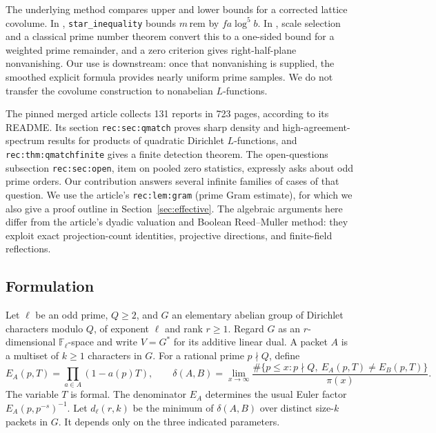 \documentclass[11pt]{article}
\theoremstyle{remark}\newtheorem{remark}[theorem]{Remark}
\newcommand{\F}{\mathbb F}
\begin{document}
The underlying method compares upper and lower bounds for a corrected lattice covolume. In , \texttt{star\_inequality} bounds $m\,\mathrm{rem}$ by $fa\log^5 b$. In , scale selection and a classical prime number theorem convert this to a one-sided bound for a weighted prime remainder, and a zero criterion gives right-half-plane nonvanishing. Our use is downstream: once that nonvanishing is supplied, the smoothed explicit formula provides nearly uniform prime samples. We do not transfer the covolume construction to nonabelian $L$-functions.

The pinned merged article \cite{article} collects 131 reports in 723 pages, according to its README. Its section \texttt{rec:sec:qmatch} proves sharp density and high-agreement-spectrum results for products of quadratic Dirichlet $L$-functions, and \texttt{rec:thm:qmatchfinite} gives a finite detection theorem. The open-questions subsection \texttt{rec:sec:open}, item on pooled zero statistics, expressly asks about odd prime orders. Our contribution answers several infinite families of cases of that question. We use the article's \texttt{rec:lem:gram} (prime Gram estimate), for which we also give a proof outline in Section~\ref{sec:effective}. The algebraic arguments here differ from the article's dyadic valuation and Boolean Reed--Muller method: they exploit exact projection-count identities, projective directions, and finite-field reflections.

\subsection{Formulation}
Let $\ell$ be an odd prime, $Q\ge2$, and $G$ an elementary abelian group of Dirichlet characters modulo $Q$, of exponent $\ell$ and rank $r\ge1$. Regard $G$ as an $r$-dimensional $\F_\ell$-space and write $V=G^*$ for its additive linear dual. A packet $A$ is a multiset of $k\ge1$ characters in $G$. For a rational prime $p\nmid Q$, define
\[
 E_A(p,T)=\prod_{a\in A}(1-a(p)T),\qquad
 \delta(A,B)=\lim_{x\to\infty}\frac{\#\{p\le x:p\nmid Q,\ E_A(p,T)\ne E_B(p,T)\}}{\pi(x)}.
\]
The variable $T$ is formal. The denominator $E_A$ determines the usual Euler factor $E_A(p,p^{-s})^{-1}$. Let $d_\ell(r,k)$ be the minimum of $\delta(A,B)$ over distinct size-$k$ packets in $G$. It depends only on the three indicated parameters.
\end{document}
